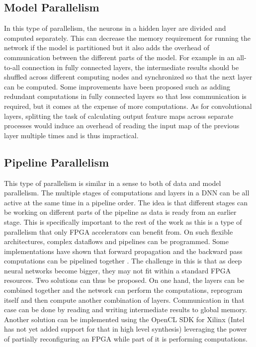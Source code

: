 \subsection{Model Parallelism}
In this type of parallelism, the neurons in a hidden layer are divided and computed separately. This can decrease the memory requirement for running the network if the model is partitioned but it also adds the overhead of communication between the different parts of the model. For example in an all-to-all connection in fully connected layers, the intermediate results should be shuffled across different computing nodes and synchronized so that the next layer can be computed. Some improvements have been proposed such as adding redundant computations in fully connected layers so that less communication is required\cite{muller1994neural},  but it comes at the expense of more computations. As for convolutional layers, splitting the task of calculating output feature maps across separate processes would induce an overhead of reading the input map of the previous layer multiple times and is thus impractical.

\subsection{Pipeline Parallelism}
This type of parallelism is similar in a sense to both of data and model parallelism. The multiple stages of computations and layers in a DNN can be all active at the same time in a pipeline order. The idea is that different stages can be working on different parts of the pipeline as data is ready from an earlier stage. This is specifically important to the rest of the work as this is a type of parallelism that only FPGA accelerators can benefit from. On such flexible architectures, complex dataflows and pipelines can be programmed. Some implementations have shown that forward propagation and the backward pass computations can be pipelined together \cite{abadi2016tensorflow, collobert2011torch7}. The challenge in this is that as deep neural networks become bigger, they may not fit within a standard FPGA resources. Two solutions can thus be proposed. On one hand, the layers can be combined together and the network can perform the computations, reprogram itself and then compute another combination of layers. Communication in that case can be done by reading and writing intermediate results to global memory. Another solution can be implemented using the OpenCL SDK for Xilinx (Intel has not yet added support for that in high level synthesis) leveraging the power of partially reconfiguring an FPGA while part of it is performing computations.
